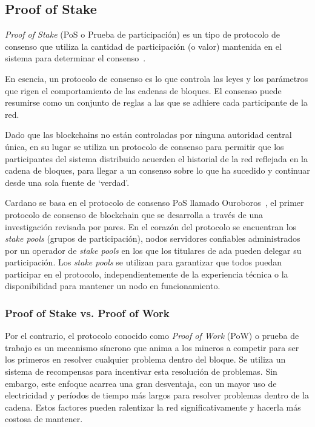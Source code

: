 \documentclass[12pt]{book}
\begin{document}
\subsection{Proof of Stake}

\textit{Proof of Stake} (PoS o Prueba de participación) es un tipo de protocolo de consenso que utiliza la cantidad de participación (o valor) mantenida en el sistema para determinar el consenso~\cite{PoS-PoW-pros-cons, PoS-PoW-energy, PoS-PoW-evaluation}.

En esencia, un protocolo de consenso es lo que controla las leyes y los parámetros que rigen el comportamiento de las cadenas de bloques. El consenso puede resumirse como un conjunto de reglas a las que se adhiere cada participante de la red.

Dado que las blockchains no están controladas por ninguna autoridad central única, en su lugar se utiliza un protocolo de consenso para permitir que los participantes del sistema distribuido acuerden el historial de la red reflejada en la cadena de bloques, para llegar a un consenso sobre lo que ha sucedido y continuar desde una sola fuente de `verdad'.

Cardano se basa en el protocolo de consenso PoS llamado Ouroboros~\cite{pof_ouroboros}, el primer protocolo de consenso de blockchain que se desarrolla a través de una investigación revisada por pares. En el corazón del protocolo se encuentran los \textit{stake pools} (grupos de participación), nodos servidores confiables administrados por un operador de \textit{stake pools} en los que los titulares de ada pueden delegar su participación. Los \textit{stake pools} se utilizan para garantizar que todos puedan participar en el protocolo, independientemente de la experiencia técnica o la disponibilidad para mantener un nodo en funcionamiento.

\subsubsection{Proof of Stake vs. Proof of Work}

Por el contrario, el protocolo conocido como \textit{Proof of Work} (PoW) o prueba de trabajo es un mecanismo síncrono que anima a los mineros a competir para ser los primeros en resolver cualquier problema dentro del bloque. Se utiliza un sistema de recompensas para incentivar esta resolución de problemas. Sin embargo, este enfoque acarrea una gran desventaja, con un mayor uso de electricidad y períodos de tiempo más largos para resolver problemas dentro de la cadena. Estos factores pueden ralentizar la red significativamente y hacerla más costosa de mantener.
\end{document}
